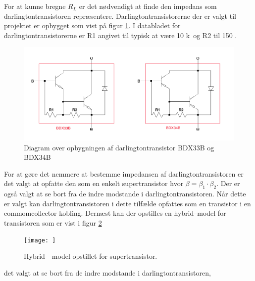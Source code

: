 For at kunne bregne $R_L$ er det nødvendigt at finde den impedans som darlingtontransistoren repræsentere. Darlingtontransistorerne der er valgt til projektet er opbygget som vist på figur \ref{darlington_diagram}. I databladet for darlingtontransistorerne   er R1 angivet til typisk at være 10 k\ohm~og R2 til 150 \ohm.

\begin{figure}[h]
\centering
\includegraphics[width=\textwidth]{teknisk/effektforstaerker/darlingtontransistor_opbygning.png}
\caption{Diagram over opbygningen af darlingtontransistor BDX33B og BDX34B}
\label{darlington_diagram}
\end{figure}

For at gøre det nemmere at bestemme impedansen af darlingtontransistoren er det valgt at opfatte den som en enkelt supertransistor hvor $\beta = \beta_1 \cdot \beta_2$. Der er også valgt at se bort fra de indre modstande i darlingtontransistoren. Når dette er valgt kan darlingtontransistoren i dette tilfælde opfattes som en transistor i en commomcollector kobling. Dernæst kan der opstilles en hybrid--model for transistoren som er vist i figur \ref{hybridpimodel_darlington} 

\begin{figure}[h]
\centering
\texttt{[image: ]}
\caption{Hybrid- -model opstillet for supertransistor.}
\label{hybridpimodel_darlington}
\end{figure}



det valgt at se bort fra de indre modstande i darlingtontransistoren,